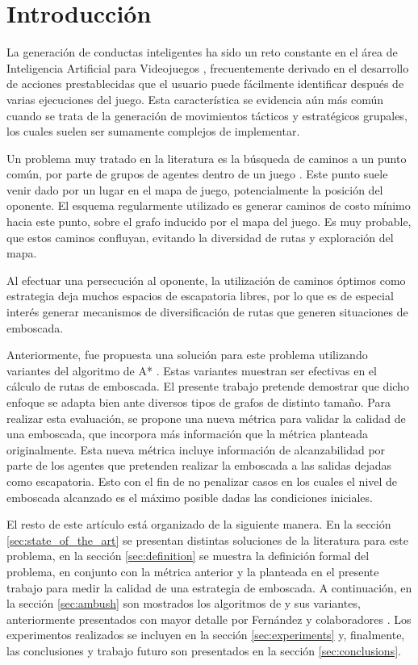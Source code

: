\section{Introducci\'on}

La generaci\'on de conductas inteligentes ha sido un reto constante
en el \'area de Inteligencia Artificial para Videojuegos \cite{MF09},
frecuentemente derivado en el desarrollo de acciones prestablecidas que
el usuario puede f\'acilmente identificar despu\'es de varias ejecuciones
del juego. Esta caracter\'istica se evidencia a\'un m\'as com\'un cuando
se trata de la generaci\'on de movimientos t\'acticos y estrat\'egicos
grupales, los cuales suelen ser sumamente complejos de implementar.

Un problema muy tratado en la literatura es la b\'usqueda de caminos
a un punto com\'un, por parte de grupos de agentes dentro de un juego
\cite{MF09}. Este punto suele venir dado por un lugar en el mapa de juego,
potencialmente la posici\'on del oponente. El esquema regularmente utilizado
es generar caminos de costo m\'inimo \cite{HNR72} \cite{RN93}
hacia este punto, sobre el grafo inducido por el mapa del juego. Es
muy probable, que estos caminos confluyan, evitando la diversidad de
rutas y exploraci\'on del mapa.

Al efectuar una persecuci\'on al oponente, la utilizaci\'on de caminos
\'optimos como estrategia deja muchos espacios de escapatoria libres,
por lo que es de especial inter\'es generar mecanismos de diversificaci\'on de
rutas que generen situaciones de emboscada.

Anteriormente, fue propuesta una soluci\'on para este problema utilizando
variantes del algoritmo de A* \cite{FGC12e}\cite{FGC12}. Estas
variantes muestran ser efectivas en el c\'alculo de rutas de emboscada.
El presente trabajo pretende demostrar que dicho enfoque se adapta bien
ante diversos tipos de grafos de distinto tamaño.
Para realizar esta evaluaci\'on, se propone una nueva m\'etrica para validar
la calidad de una emboscada, que incorpora m\'as informaci\'on que la m\'etrica
planteada originalmente. Esta nueva m\'etrica incluye informaci\'on de
alcanzabilidad por parte de los agentes que pretenden realizar la emboscada
a las salidas dejadas como escapatoria. Esto con el fin de no penalizar casos
en los cuales el nivel de emboscada alcanzado es el m\'aximo posible
dadas las condiciones iniciales.

El resto de este art\'iculo est\'a organizado de la siguiente manera.
En la secci\'on \ref{sec:state_of_the_art} se presentan distintas soluciones
de la literatura para este problema, en la secci\'on \ref{sec:definition}
se muestra la definici\'on formal del problema, en conjunto con la m\'etrica
anterior y la planteada en el presente trabajo para medir la calidad de una
estrategia de emboscada. A continuaci\'on, en la secci\'on \ref{sec:ambush}
son mostrados los algoritmos de \ambush y sus variantes, anteriormente
presentados con mayor detalle por Fern\'andez y colaboradores
\cite{FGC12e}\cite{FGC12}. Los ex\-pe\-ri\-men\-tos realizados se incluyen en
la secci\'on \ref{sec:experiments} y, finalmente, las conclusiones y trabajo
futuro son presentados en la secci\'on \ref{sec:conclusions}.
